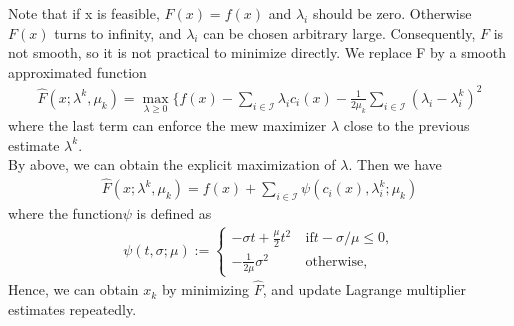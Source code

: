 \documentclass[11pt,a4paper]{article}
\renewcommand{\(}{\left(}
\renewcommand{\)}{\right)}
\begin{document}
Note that if x is feasible, $F(x)=f(x)$ and $\lambda_{i}$ should be zero. Otherwise $F(x)$ turns to infinity, and $\lambda_{i}$ can be chosen arbitrary large. Consequently, $F$ is not smooth, so it is not practical to minimize directly. We replace F by a smooth approximated function
\begin{align*}
\widehat{F}(x;\lambda^{k},\mu_{k})=\max_{\lambda\geq 0}\lbrace f(x)-\sum_{i\in\mathcal{I}}\lambda_{i}c_{i}(x)-\frac{1}{2\mu_{k}}\sum_{i\in\mathcal{I}}(\lambda_{i}-\lambda_{i}^{k})^{2}
\end{align*}
where the last term can enforce the mew maximizer $\lambda$ close to the previous estimate $\lambda^{k}$.\\
By above, we can obtain the explicit maximization of $\lambda$. Then we have 
\begin{align*}
\widehat{F}(x;\lambda^{k},\mu_{k})=f(x)+\sum_{i\in\mathcal{I}}\psi(c_{i}(x),\lambda^{k}_{i};\mu_{k})
\end{align*}
where the function$\psi$ is defined as
\begin{align*}
\psi(t,\sigma;\mu):=
\begin{cases}
-\sigma t+\frac{\mu}{2}t^{2}~&\text{if} t-\sigma/\mu\leq 0,\\
-\frac{1}{2\mu}\sigma^{2} &\text{otherwise,}
\end{cases}
\end{align*}
Hence, we can obtain $x_{k}$ by minimizing $\widehat{F}$, and update Lagrange multiplier estimates repeatedly.
\end{document}
